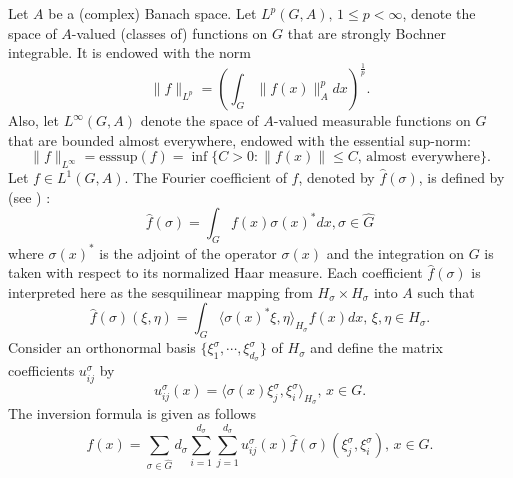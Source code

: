 \documentclass[12pt]{amsart}%
\begin{document}
Let $A$ be a (complex) Banach space. Let $L^p(G,A),\,1\leq p<\infty$, denote the space of $A$-valued (classes of) functions on $G$ that are strongly Bochner integrable. It is endowed with the norm
$$\|f\|_{L^p}=\left( \int_G \|f(x)\|_A^pdx\right)^{\frac{1}{p}}.$$
Also, let $L^\infty (G,A)$ denote the space of $A$-valued measurable functions on $G$ that are bounded almost everywhere,  endowed with the essential sup-norm:
$$\|f\|_{L^\infty}=\mbox{esssup}(f)=\inf\{C>0 : \|f(x)\|\leq C, \, \mbox{almost everywhere} \}.$$
Let $f\in L^1(G,A)$. The Fourier coefficient of $f$,  denoted by $\widehat{f}(\sigma)$,  is  defined by (see \cite{AssiamouaOlubummo1989}) :
\begin{equation}
\widehat{f}(\sigma)=\int_G f(x)\sigma (x)^*dx, \sigma \in \widehat{G}
\end{equation}
where $\sigma (x)^*$ is the adjoint of the operator $\sigma (x)$ and the integration on $G$ is taken with respect to its normalized Haar measure. 
 Each coefficient  $\widehat{f}(\sigma)$ is interpreted here as the sesquilinear mapping from $H_\sigma \times  H_\sigma$ into $A$ such that 
 \begin{equation}
 \widehat{f}(\sigma)(\xi,\eta)=\int_G \langle \sigma (x)^*\xi,\eta \rangle_{H_\sigma}f(x) dx,\, \xi,\eta\in  H_\sigma.  
\end{equation}  
Consider an orthonormal basis $\{\xi_1^\sigma, \cdots, \xi_{d_\sigma}^\sigma\}$ of $H_{\sigma}$ and define the matrix coefficients  $u_{ij}^\sigma$ by 
$$u_{ij}^\sigma (x)=\langle\sigma (x)\xi_j^\sigma, \xi_i^\sigma \rangle_{H_\sigma},\, x\in G. $$
The inversion formula is given as follows
\begin{equation}
f(x)=\sum\limits_{\sigma \in \widehat{G}}d_\sigma \sum\limits_{i=1}^{d_\sigma}\sum\limits_{j=1}^{d_\sigma}u^\sigma_{ij}(x)\widehat{f}(\sigma)(\xi_j^\sigma, \xi_i^\sigma),\, x\in G.
\end{equation}
\end{document}
